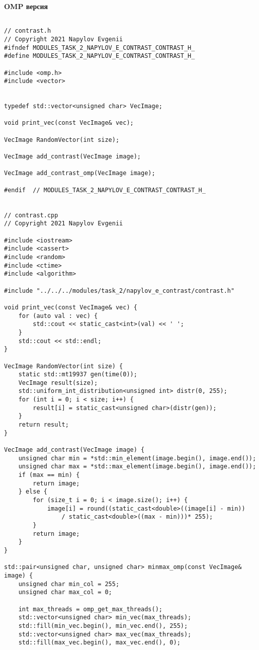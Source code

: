 \documentclass{report}
\begin{document}
	\textbf{OMP версия}
    \begin{lstlisting}

// contrast.h
// Copyright 2021 Napylov Evgenii
#ifndef MODULES_TASK_2_NAPYLOV_E_CONTRAST_CONTRAST_H_
#define MODULES_TASK_2_NAPYLOV_E_CONTRAST_CONTRAST_H_

#include <omp.h>
#include <vector>


typedef std::vector<unsigned char> VecImage;

void print_vec(const VecImage& vec);

VecImage RandomVector(int size);

VecImage add_contrast(VecImage image);

VecImage add_contrast_omp(VecImage image);

#endif  // MODULES_TASK_2_NAPYLOV_E_CONTRAST_CONTRAST_H_


// contrast.cpp
// Copyright 2021 Napylov Evgenii

#include <iostream>
#include <cassert>
#include <random>
#include <ctime>
#include <algorithm>

#include "../../../modules/task_2/napylov_e_contrast/contrast.h"

void print_vec(const VecImage& vec) {
    for (auto val : vec) {
        std::cout << static_cast<int>(val) << ' ';
    }
    std::cout << std::endl;
}

VecImage RandomVector(int size) {
    static std::mt19937 gen(time(0));
    VecImage result(size);
    std::uniform_int_distribution<unsigned int> distr(0, 255);
    for (int i = 0; i < size; i++) {
        result[i] = static_cast<unsigned char>(distr(gen));
    }
    return result;
}

VecImage add_contrast(VecImage image) {
    unsigned char min = *std::min_element(image.begin(), image.end());
    unsigned char max = *std::max_element(image.begin(), image.end());
    if (max == min) {
        return image;
    } else {
        for (size_t i = 0; i < image.size(); i++) {
            image[i] = round((static_cast<double>((image[i] - min))
                / static_cast<double>((max - min)))* 255);
        }
        return image;
    }
}

std::pair<unsigned char, unsigned char> minmax_omp(const VecImage& image) {
    unsigned char min_col = 255;
    unsigned char max_col = 0;

    int max_threads = omp_get_max_threads();
    std::vector<unsigned char> min_vec(max_threads);
    std::fill(min_vec.begin(), min_vec.end(), 255);
    std::vector<unsigned char> max_vec(max_threads);
    std::fill(max_vec.begin(), max_vec.end(), 0);


\end{lstlisting}
\end{document}

